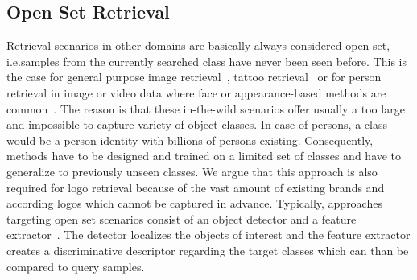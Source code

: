 \documentclass[a4paper,twoside]{article}
\newcommand{\xie}{i.e.}
\begin{document}
\subsection{Open Set Retrieval}
Retrieval scenarios in other domains are basically always considered open set, \xie samples from the currently searched class have never been seen before.
This is the case for general purpose image retrieval~\cite{sivic2003}, tattoo retrieval~\cite{manger2012} or for person retrieval in image or video data where face or appearance-based methods are common~\cite{bauml2010,weber2011,herrmann2015b}. The reason is that these in-the-wild scenarios offer usually a too large and impossible to capture variety of object classes. In case of persons, a class would be a person identity with billions of persons existing. Consequently, methods have to be designed and trained on a limited set of classes and have to generalize to previously unseen classes. We argue that this approach is also required for logo retrieval because of the vast amount of existing brands and according logos which cannot be captured in advance.
Typically, approaches targeting open set scenarios consist of an object detector and a feature extractor~\cite{??}. The detector localizes the objects of interest and the feature extractor creates a discriminative descriptor regarding the target classes which can than be compared to query samples.

\end{document}
